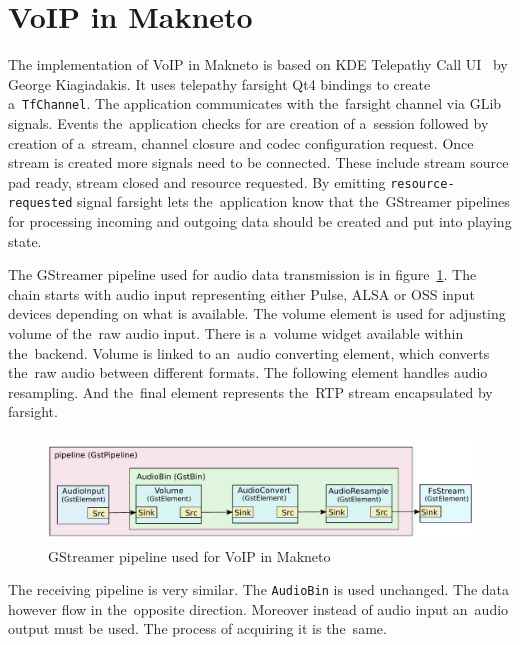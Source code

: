 \section{VoIP in Makneto}
The implementation of VoIP in Makneto is based on KDE Telepathy Call UI~\cite{kdeTpCallUI} by George Kiagiadakis. It uses telepathy farsight Qt4 bindings to create a~\verb|TfChannel|. The application communicates with the~farsight channel via GLib signals. Events the~application checks for are creation of a~session followed by creation of a~stream, channel closure and codec configuration request. Once stream is created more signals need to be connected. These include stream source pad ready, stream closed and resource requested. By emitting \verb|resource-requested| signal farsight lets the~application know that the~GStreamer pipelines for processing incoming and outgoing data should be created and put into playing state. 

The GStreamer pipeline used for audio data transmission is in figure~\ref{fig:maknetoGstreamerPipeline}. The chain starts with audio input representing either Pulse, ALSA or OSS input devices depending on what is available. The volume element is used for adjusting volume of the~raw audio input. There is a~volume widget available within the~backend. Volume is linked to an~audio converting element, which converts the~raw audio between different formats. The following element handles audio resampling. And the~final element represents the~RTP stream encapsulated by farsight. 

\begin{figure}[ht]
	\begin{center}
	\includegraphics[width=15cm]{fig/makneto-gstreamer-pipeline.pdf}
	\caption{GStreamer pipeline used for VoIP in Makneto}
	\label{fig:maknetoGstreamerPipeline}
\end{center}
\end{figure}

The receiving pipeline is very similar. The \verb|AudioBin| is used unchanged. The data however flow in the~opposite direction. Moreover instead of audio input an~audio output must be used. The process of acquiring it is the~same.


